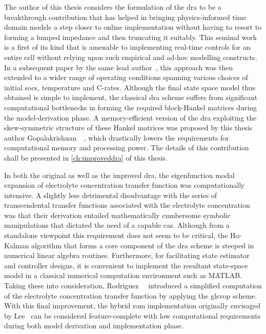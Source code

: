 The author  of this thesis  considers the formulation of  the \gls{dra} to  be a
breakthrough  contribution that  has  helped in  bringing physics-informed  time
domain models a step closer to online implementation without having to resort to
forming a lumped impedance and then truncating it suitably. This seminal work is
a first  of its  kind that  is amenable to  implementing real-time  controls for
an  entire  cell  without  relying  upon such  empirical  and  ad-hoc  modelling
constructs. In a  subsequent paper by the same  lead author~\cite{Lee2014}, this
approach was  then extended to  a wider  range of operating  conditions spanning
various  choices  of  initial  \glspl{soc}, temperature  and  C-rates.  Although
the  final  state  space  model  thus  obtained  is  simple  to  implement,  the
classical \gls{dra} scheme suffers from significant computational bottlenecks in
forming the  required block-Hankel  matrices during the  model-derivation phase.
A  memory-efficient  version  of  the \gls{dra}  exploiting  the  skew-symmetric
structure of  these Hankel  matrices was  proposed by  this thesis  author \ie{}
Gopalakrishnan~\etal{}~\cite{Gopalakrishnan2017},  which drastically  lowers the
requirements for computational memory and  processing power. The details of this
contribution shall be presented in \cref{ch:improveddra} of this thesis.


In both the original as well  as the improved \gls{dra}, the eigenfunction modal
expansion  of electrolyte  concentration transfer  function was  computationally
intensive.  A  slightly  less  detrimental   disadvantage  with  the  series  of
transcendental transfer functions associated  with the electrolyte concentration
was   that  their   derivation  entailed   mathematically  cumbersome   symbolic
manipulations that  dictated the need  of a  capable \gls{cas}. Although  from a
standalone  viewpoint  this  requirement  does  not seem  to  be  critical,  the
\mbox{Ho-Kalman}  algorithm  that  forms  a  core  component  of  the  \gls{dra}
scheme  is  steeped  in  numerical linear  algebra  routines.  Furthermore,  for
facilitating  state  estimator  and  controller designs,  it  is  convenient  to
implement the resultant  state-space model in a  classical numerical computation
environment   such  as   \textsc{MATLAB}.  Taking   these  into   consideration,
Rodriguez~\etal{}~\cite{Rodriguez2017}  introduced a  simplified computation  of
the  electrolyte  concentration  transfer  function  by  applying  the  gls{vop}
scheme.  With  this  final  improvement,  the  hybrid  \gls{rom}  implementation
originally envisaged by Lee~\etal{} can  be considered feature-complete with low
computational  requirements  during  both model  derivation  and  implementation
phase.


